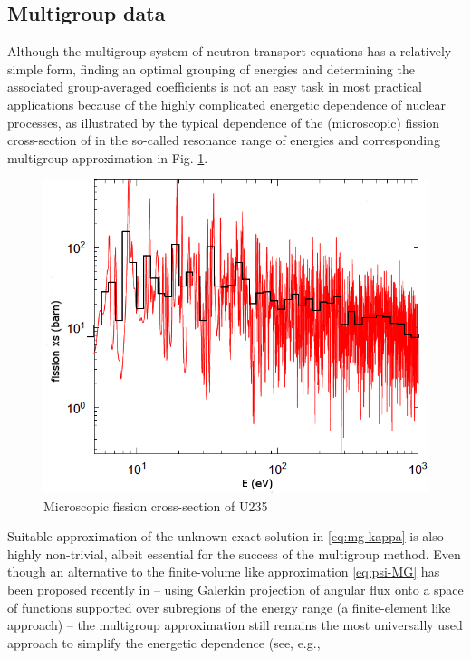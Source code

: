 \subsection{Multigroup data}
Although the multigroup system of neutron transport equations has a relatively simple form, finding an optimal grouping
of energies and determining the associated group-averaged coefficients is not an easy task in most practical
applications because of the highly complicated energetic dependence of nuclear processes, as illustrated by the typical
dependence of the (microscopic) fission cross-section of  in the so-called resonance range of
energies and corresponding multigroup approximation in Fig. \ref{fig:xs}.
\begin{figure}[htp]
\begin{center}
  \includegraphics[scale=.4]{U235fg}
  \caption{Microscopic fission cross-section of U235}
  \label{fig:xs}
\end{center}
\end{figure}
Suitable approximation of the unknown exact solution in \eqref{eq:mg-kappa} is also highly non-trivial, albeit essential
for the success of the multigroup method. Even though an alternative to the finite-volume like approximation
\eqref{eq:psi-MG} has been proposed recently  in \cite{Douglass} -- using Galerkin projection of angular flux onto a
space of functions supported over subregions of the energy range (a finite-element like approach) --  the multigroup 
approximation still remains the most universally used approach to simplify the energetic dependence (see, e.g., 
